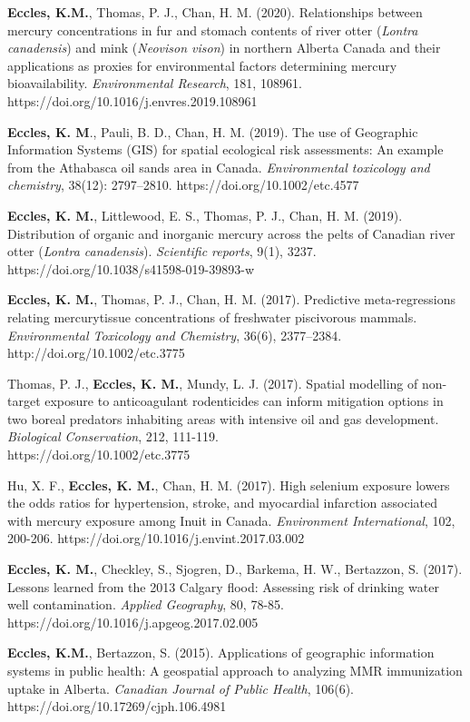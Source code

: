 \documentclass[margin,line]{res}
\begin{document}
\begin{resume}
\textbf{Eccles, K.M.}, Thomas, P. J., Chan, H. M. (2020). Relationships between mercury concentrations in fur and stomach contents of river otter (\textit{Lontra canadensis}) and mink (\textit{Neovison vison}) in northern Alberta Canada and their applications as proxies for environmental factors determining mercury bioavailability. \textit{Environmental Research}, 181, 108961. https://doi.org/10.1016/j.envres.2019.108961

\textbf{Eccles, K. M}., Pauli, B. D., Chan, H. M. (2019). The use of Geographic Information Systems (GIS) for spatial ecological risk assessments: An example from the Athabasca oil sands area in Canada. \textit{Environmental toxicology and chemistry}, 38(12): 2797–2810. https://doi.org/10.1002/etc.4577

\textbf{Eccles, K. M.}, Littlewood, E. S., Thomas, P. J., Chan, H. M. (2019). Distribution of organic and inorganic mercury across the pelts of Canadian river otter (\textit{Lontra canadensis}). \textit{Scientific reports}, 9(1), 3237. https://doi.org/10.1038/s41598-019-39893-w

\textbf{Eccles, K. M.}, Thomas, P. J., Chan, H. M. (2017). Predictive meta-regressions relating mercurytissue concentrations of freshwater piscivorous mammals. \textit{Environmental Toxicology and Chemistry}, 36(6), 2377–2384. http://doi.org/10.1002/etc.3775

Thomas, P. J., \textbf{Eccles, K. M.}, Mundy, L. J. (2017). Spatial modelling of non-target exposure to anticoagulant rodenticides can inform mitigation options in two boreal predators inhabiting areas with intensive oil and gas development. \textit{Biological Conservation}, 212, 111-119. \\https://doi.org/10.1002/etc.3775

Hu, X. F., \textbf{Eccles, K. M.}, Chan, H. M. (2017). High selenium exposure lowers the odds ratios for hypertension, stroke, and myocardial infarction associated with mercury exposure among Inuit in Canada. \textit{Environment International}, 102, 200-206. https://doi.org/10.1016/j.envint.2017.03.002

\textbf{Eccles, K. M.}, Checkley, S., Sjogren, D., Barkema, H. W., Bertazzon, S. (2017). Lessons learned from the 2013 Calgary flood: Assessing risk of drinking water well contamination. \textit{Applied Geography}, 80, 78-85. https://doi.org/10.1016/j.apgeog.2017.02.005

\textbf{Eccles, K.M.}, Bertazzon, S. (2015). Applications of geographic information systems in public health: A geospatial approach to analyzing MMR immunization uptake in Alberta. \textit{Canadian Journal of Public Health}, 106(6). https://doi.org/10.17269/cjph.106.4981


\end{resume}
\end{document}

